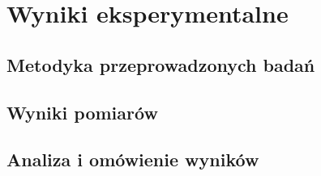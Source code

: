 
\chapter{Wyniki eksperymentalne}
\label{ch:wyniki}

\section{Metodyka przeprowadzonych badań}

\section{Wyniki pomiarów}

\section{Analiza i omówienie wyników}
